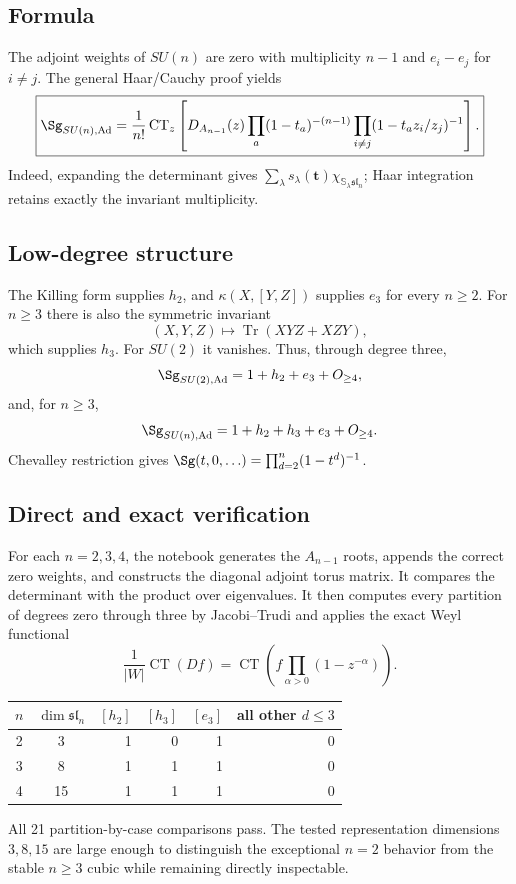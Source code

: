 \documentclass[10pt]{article}
\newcommand{\CT}{\operatorname{CT}}
\begin{document}
\subsection{Formula}
The adjoint weights of $SU(n)$ are zero with multiplicity $n-1$ and
$e_i-e_j$ for $i\ne j$.  The general Haar/Cauchy proof yields
\[
 \boxed{\Sg_{SU(n),\mathrm{Ad}}=
 \frac1{n!}\CT_z\left[D_{A_{n-1}}(z)
 \prod_a(1-t_a)^{-(n-1)}
 \prod_{i\ne j}(1-t_a z_i/z_j)^{-1}\right].}
\]
Indeed, expanding the determinant gives
$\sum_\lambda s_\lambda(\mathbf t)\chi_{\mathbb S_\lambda\mathfrak{sl}_n}$;
Haar integration retains exactly the invariant multiplicity.

\subsection{Low-degree structure}
The Killing form supplies $h_2$, and
$\kappa(X,[Y,Z])$ supplies $e_3$ for every $n\ge2$.  For $n\ge3$ there is also
the symmetric invariant
\[
 (X,Y,Z)\longmapsto\operatorname{Tr}(XYZ+XZY),
\]
which supplies $h_3$.  For $SU(2)$ it vanishes.  Thus, through degree three,
\[
 \Sg_{SU(2),\mathrm{Ad}}=1+h_2+e_3+O_{\ge4},
\]
and, for $n\ge3$,
\[
 \Sg_{SU(n),\mathrm{Ad}}=1+h_2+h_3+e_3+O_{\ge4}.
\]
Chevalley restriction gives
$\Sg(t,0,\ldots)=\prod_{d=2}^n(1-t^d)^{-1}$.

\subsection{Direct and exact verification}
For each $n=2,3,4$, the notebook generates the $A_{n-1}$ roots, appends the
correct zero weights, and constructs the diagonal adjoint torus matrix.
It compares the determinant with the product over eigenvalues.  It then
computes every partition of degrees zero through three by Jacobi--Trudi and
applies the exact Weyl functional
\[
 \frac1{|W|}\CT(Df)=\CT\left(f\prod_{\alpha>0}(1-z^{-\alpha})\right).
\]

\begin{center}\small
\begin{tabular}{@{}c|c|rrrr@{}}\toprule
$n$&$\dim\mathfrak{sl}_n$&$[h_2]$&$[h_3]$&$[e_3]$&all other $d\le3$\\\midrule
2&3&1&0&1&0\\
3&8&1&1&1&0\\
4&15&1&1&1&0\\\bottomrule
\end{tabular}
\end{center}
All 21 partition-by-case comparisons pass.  The tested representation
dimensions $3,8,15$ are large enough to distinguish the exceptional $n=2$
behavior from the stable $n\ge3$ cubic while remaining directly inspectable.
\end{document}

